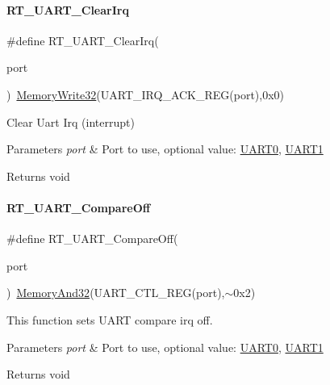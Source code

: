 \paragraph{\texorpdfstring{R\+T\+\_\+\+U\+A\+R\+T\+\_\+\+Clear\+Irq}{RT\_UART\_ClearIrq}}
{\footnotesize\ttfamily \#define R\+T\+\_\+\+U\+A\+R\+T\+\_\+\+Clear\+Irq(\begin{DoxyParamCaption}\item[{}]{port }\end{DoxyParamCaption})~\mbox{\hyperlink{a00020_a6b9732365b12e48ddb89fe1028b975b0}{Memory\+Write32}}(U\+A\+R\+T\+\_\+\+I\+R\+Q\+\_\+\+A\+C\+K\+\_\+\+R\+EG(port),0x0)}



Clear Uart Irq (interrupt) 


\begin{DoxyParams}{Parameters}
{\em port} & Port to use, optional value\+: \mbox{\hyperlink{a00056_a0508661f121639ffdee7de2353a0def2}{U\+A\+R\+T0}}, \mbox{\hyperlink{a00056_a8d69bf04d07af4fbbab5a8bd291f65ff}{U\+A\+R\+T1}} \\
\hline
\end{DoxyParams}
\begin{DoxyReturn}{Returns}
void 
\end{DoxyReturn}
\mbox{\label{a00056_aab59c28b31f6d93c8400c2af10cc0b05}} 
\paragraph{\texorpdfstring{R\+T\+\_\+\+U\+A\+R\+T\+\_\+\+Compare\+Off}{RT\_UART\_CompareOff}}
{\footnotesize\ttfamily \#define R\+T\+\_\+\+U\+A\+R\+T\+\_\+\+Compare\+Off(\begin{DoxyParamCaption}\item[{}]{port }\end{DoxyParamCaption})~\mbox{\hyperlink{a00020_ad87cedffcaadc51db22594fce55173d4}{Memory\+And32}}(U\+A\+R\+T\+\_\+\+C\+T\+L\+\_\+\+R\+EG(port),$\sim$0x2)}



This function sets U\+A\+RT compare irq off. 


\begin{DoxyParams}{Parameters}
{\em port} & Port to use, optional value\+: \mbox{\hyperlink{a00056_a0508661f121639ffdee7de2353a0def2}{U\+A\+R\+T0}}, \mbox{\hyperlink{a00056_a8d69bf04d07af4fbbab5a8bd291f65ff}{U\+A\+R\+T1}} \\
\hline
\end{DoxyParams}
\begin{DoxyReturn}{Returns}
void 
\end{DoxyReturn}
\mbox{\label{a00056_aab5e3da11e9f9d531cab23aa451d2356}} 
